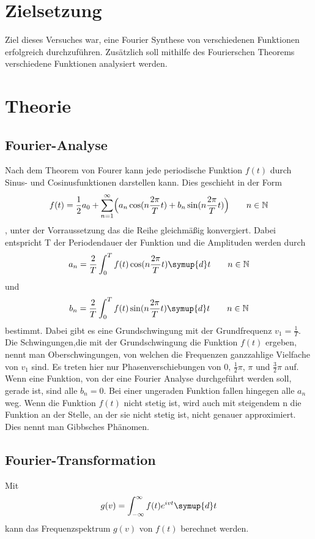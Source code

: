 \section{Zielsetzung}
\label{sec:Zielsetzung}
Ziel dieses Versuches war, eine Fourier Synthese von verschiedenen Funktionen erfolgreich durchzuführen.
Zusätzlich soll mithilfe des Fourierschen Theorems verschiedene Funktionen analysiert werden.

\section{Theorie \cite{V351}}
\label{sec:Theorie}
\subsection{Fourier-Analyse}
Nach dem Theorem von Fourer kann jede periodische Funktion $f(t)$ durch Sinus- und Cosinusfunktionen darstellen kann.
Dies geschieht in der Form 
\begin{equation}
    f(t)=\frac{1}{2}a_0+\sum_{n=1}^{\infty}\Bigl(a_n \cos (n \frac{2 \pi}{T} t) + b_n \sin(n \frac{2\pi}{T}t)\Bigr) \qquad n\in\mathbb{N}
    \label{eqn:reihe}
\end{equation}, unter der Vorraussetzung das die Reihe gleichmäßig konvergiert.
Dabei entspricht T der Periodendauer der Funktion und die Amplituden werden durch
\begin{equation}
    a_n=\frac{2}{T}\int_0^T f(t) \cos(n \frac{2\pi}{T}t) \symup{d}t \qquad n\in\mathbb{N}
    \label{eqn:a_n}
\end{equation}
und 
\begin{equation}
    b_n=\frac{2}{T}\int_0^T f(t) \sin(n \frac{2\pi}{T}t) \symup{d}t \qquad n\in\mathbb{N}
    \label{eqn:b_n}
\end{equation}
bestimmt.
Dabei gibt es eine Grundschwingung mit der Grundfrequenz $v_1=\frac{1}{T}$.
Die Schwingungen,die mit der Grundschwingung die Funktion $f(t)$ ergeben, nennt man Oberschwingungen, von welchen die Frequenzen ganzzahlige Vielfache von $v_1$ sind.
Es treten hier nur Phasenverschiebungen von 0, $\frac{1}{2}\pi$, $\pi$ und $\frac{3}{2}\pi$ auf.
Wenn eine Funktion, von der eine Fourier Analyse durchgeführt werden soll, gerade ist, sind alle $b_n=0$.
Bei einer ungeraden Funktion fallen hingegen alle $a_n$ weg.
Wenn die Funktion $f(t)$ nicht stetig ist, wird auch mit steigendem n die Funktion an der Stelle, an der sie nicht stetig ist, nicht genauer approximiert.
Dies nennt man Gibbsches Phänomen.

\subsection{Fourier-Transformation}
Mit
\begin{equation*}
    g(v)=\int_{-\infty}^{\infty} f(t) e^{ivt} \symup{d}t
    \label{eqn:trafo}
\end{equation*}
kann das Frequenzspektrum $g(v)$ von $f(t)$ berechnet werden.%
\\

